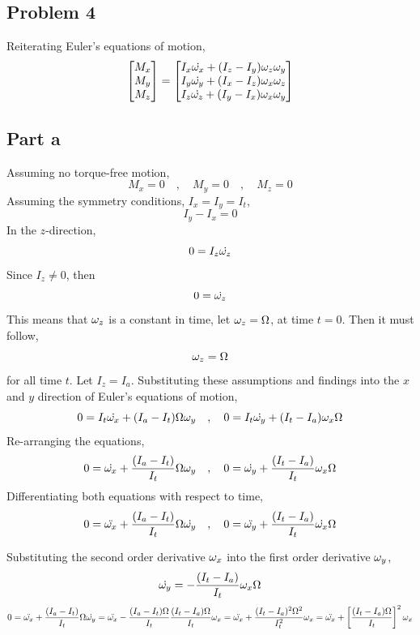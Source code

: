 \documentclass[class=report, 12pt, crop=false]{standalone}
\begin{document}
\begin{center}
\section{Problem 4}

Reiterating Euler's equations of motion,
$$\begin{bmatrix}M_x \\ M_y \\ M_z\end{bmatrix} = \begin{bmatrix} 
I_{x}\dot{\omega_x} + (I_{z} - I_{y})\omega_z\omega_y\\
I_{y}\dot{\omega_y} + (I_{x} - I_{z})\omega_x\omega_z\\
I_{z}\dot{\omega_z} + (I_{y} - I_{x})\omega_x\omega_y
\end{bmatrix}$$
\subsection{Part a}
Assuming no torque-free motion,
$$M_x = 0 \quad,\quad M_y = 0 \quad,\quad M_z = 0$$
Assuming the symmetry conditions, $I_x = I_y = I_t$,
$$I_{y} - I_{x} = 0$$
In the $z$-direction,
$$0 = I_{z}\dot{\omega_z}$$
Since $I_z\neq 0$, then
$$0 = \dot{\omega_z}$$
This means that $\omega_z$ is a constant in time, let $\omega_z = \Omega$, at time $t=0$. Then it must follow,
$$\omega_z = \Omega$$
for all time $t$. Let $I_z = I_a$. Substituting these assumptions and findings into the $x$ and $y$ direction of Euler's equations of motion,
$$0 = I_{t}\dot{\omega_x} + (I_{a} - I_{t})\Omega\omega_y \quad,\quad 0 = I_{t}\dot{\omega_y} + (I_{t} - I_{a})\omega_x\Omega$$
Re-arranging the equations,
$$0 = \dot{\omega_x} + \frac{(I_{a} - I_{t})}{I_{t}}\Omega\omega_y \quad,\quad 0 = \dot{\omega_y} + \frac{(I_{t} - I_{a})}{I_{t}}\omega_x\Omega$$
Differentiating both equations with respect to time,
$$0 = \ddot{\omega_x} + \frac{(I_{a} - I_{t})}{I_{t}}\Omega\dot{\omega_y} \quad,\quad 0 = \ddot{\omega_y} + \frac{(I_{t} - I_{a})}{I_{t}}\dot{\omega_x}\Omega$$

Substituting the second order derivative $\omega_x$ into the first order derivative $\omega_y$,
$$\dot{\omega_y} = -\frac{(I_{t} - I_{a})}{I_{t}}\omega_x\Omega$$
$$0 = \ddot{\omega_x} + \frac{(I_{a} - I_{t})}{I_{t}}\Omega\dot{\omega_y} = \ddot{\omega_x} - \frac{(I_{a} - I_{t})\Omega}{I_{t}}\frac{(I_{t} - I_{a})\Omega}{I_{t}}\omega_x = \ddot{\omega_x} + \frac{(I_{t}-I_{a})^2\Omega^2}{I_{t}^2}\omega_x = \ddot{\omega_x} + \left[\frac{(I_{t}-I_{a})\Omega}{I_{t}}\right]^2\omega_x$$


\end{center}
\end{document}
